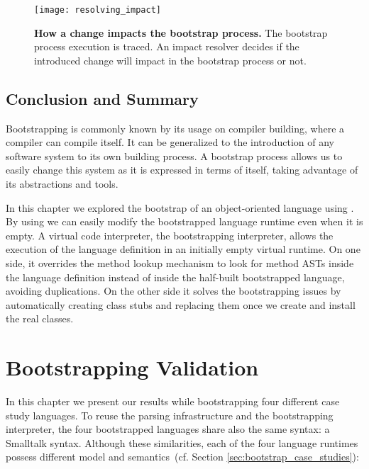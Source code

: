 \begin{figure}[ht]
\center
\texttt{[image: resolving\_impact]}
\caption{\textbf{How a change impacts the bootstrap process.} The bootstrap process execution is traced. An impact resolver decides if the introduced change will impact in the bootstrap process or not.\label{fig:resolving_impact}}
\end{figure}

\section{Conclusion and Summary}

Bootstrapping is commonly known by its usage on compiler building, where a compiler can compile itself.
It can be generalized to the introduction of any software system to its own building process.
A bootstrap process allows us to easily change this system as it is expressed in terms of itself, taking advantage of its abstractions and tools.

In this chapter we explored the bootstrap of an object-oriented language using \Vtt. By using \Vtt we can easily modify the bootstrapped language runtime even when it is empty. A virtual code interpreter, the bootstrapping interpreter, allows the execution of the language definition in an initially empty virtual runtime. On one side, it overrides the method lookup mechanism to look for method ASTs inside the language definition instead of inside the half-built bootstrapped language, avoiding duplications. On the other side it solves the bootstrapping issues by automatically creating class stubs and replacing them once we create and install the real classes.
%

\chapter{Bootstrapping Validation} \label{sec:bootstrapping_validation}
\minitoc
\introduction

In this chapter we present our results while bootstrapping four different case study languages.
To reuse the parsing infrastructure and the bootstrapping interpreter, the four bootstrapped languages share also the same syntax: a Smalltalk syntax. Although these similarities, each of the four language runtimes possess different model and semantics~(cf. Section \ref{sec:bootstrap_case_studies}):

